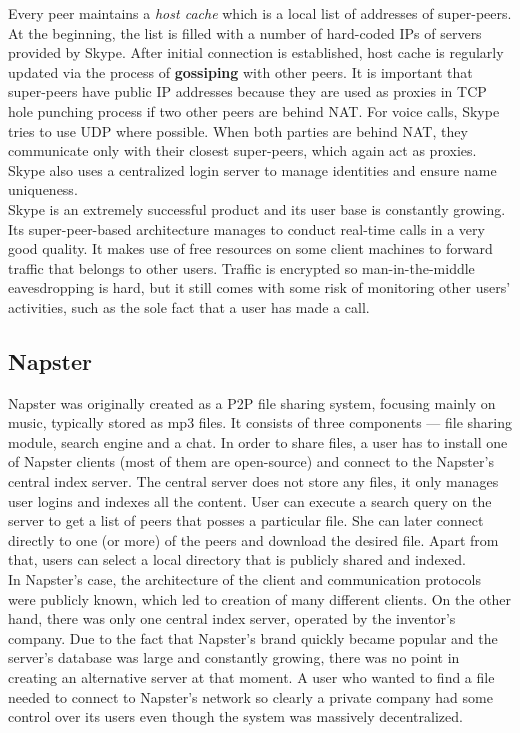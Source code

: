 \documentclass{pracamgren}
\begin{document}
Every peer maintains a {\it host cache} which is a local list of addresses of super-peers. At the beginning, the list is filled with a number of hard-coded IPs of servers provided by Skype. After initial connection is established, host cache is regularly updated via the process of {\bf gossiping} with other peers. It is important that super-peers have public IP addresses because they are used as proxies in TCP hole punching process \cite{skype_reverse} if two other peers are behind NAT. For voice calls, Skype tries to use UDP where possible. When both parties are behind NAT, they communicate only with their closest super-peers, which again act as proxies. Skype also uses a centralized login server to manage identities and ensure name uniqueness.\\

Skype is an extremely successful product and its user base is constantly growing. Its super-peer-based architecture manages to conduct real-time calls in a very good quality. It makes use of free resources on some client machines to forward traffic that belongs to other users. Traffic is encrypted so man-in-the-middle eavesdropping is hard, but it still comes with some risk of monitoring other users' activities, such as the sole fact that a user has made a call.\\

\subsection{Napster}

Napster was originally created as a P2P file sharing system, focusing mainly on music, typically stored as mp3 files. It consists of three components --- file sharing module, search engine and a chat. In order to share files, a user has to install one of Napster clients (most of them are open-source) and connect to the Napster's central index server. The central server does not store any files, it only manages user logins and indexes all the content. User can execute a search query on the server to get a list of peers that posses a particular file. She can later connect directly to one (or more) of the peers and download the desired file. Apart from that, users can select a local directory that is publicly shared and indexed.\\

In Napster's case, the architecture of the client and communication protocols were publicly known, which led to creation of many different clients. On the other hand, there was only one central index server, operated by the inventor's company. Due to the fact that Napster's brand quickly became popular and the server's database was large and constantly growing, there was no point in creating an alternative server at that moment. A user who wanted to find a file needed to connect to Napster's network so clearly a private company had some control over its users even though the system was massively decentralized.\\
\end{document}
